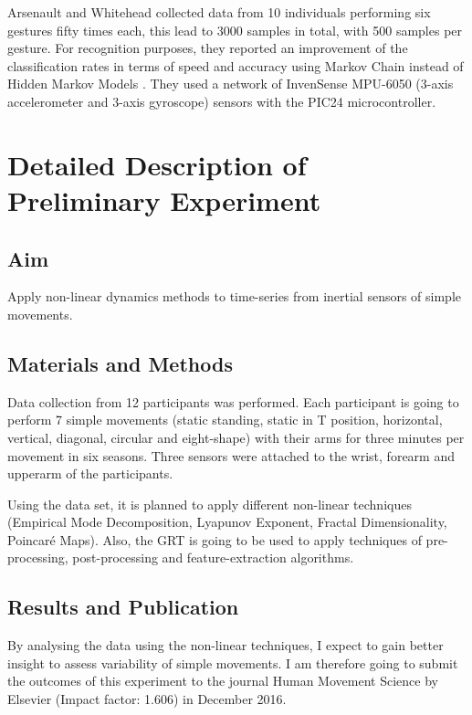 \documentclass[9pt,journal,onecolumn,compsoc]{IEEEtran}
\begin{document}
Arsenault and Whitehead collected data from 10 individuals performing six gestures fifty times each,
this lead to 3000 samples in total, with 500 samples per gesture. 
For recognition purposes, they reported an improvement of the classification rates
in terms of speed and accuracy using Markov Chain instead of Hidden Markov Models \cite{Arsenault2015_a, Arsenault2015_b}.
They used a network of InvenSense MPU-6050 (3-axis accelerometer and 3-axis gyroscope) sensors with the  PIC24 microcontroller.
  
% 
 
\section{Detailed Description of Preliminary Experiment}

\subsection{Aim}
Apply non-linear dynamics methods to time-series from inertial sensors of 
simple movements.

\subsection{Materials and Methods}
Data collection from 12 participants was performed. 
Each participant is going to 
perform 7 simple movements (static standing, static in T position, horizontal,
vertical, diagonal, circular and eight-shape) with their arms for three minutes per movement
in six seasons.
Three sensors were attached to the wrist, forearm and upperarm of the participants.

Using the data set, it is planned to apply different non-linear techniques 
(Empirical Mode Decomposition, Lyapunov Exponent, Fractal Dimensionality, Poincar\'e Maps).
Also, the GRT is going to be used to apply techniques of 
pre-processing, post-processing and feature-extraction algorithms.

\subsection{Results and Publication}
By analysing the data using the non-linear techniques, I expect to
gain better insight to assess variability of simple movements.
I am therefore going to submit the outcomes of this experiment to
the journal Human Movement Science by Elsevier (Impact factor: 1.606) in December 2016.
\end{document}
